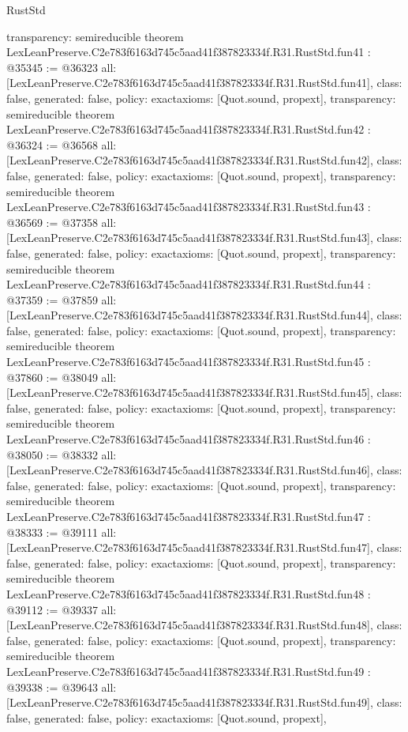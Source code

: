 \begin{lexlean}{RustStd}
\begin{coremodule}
{  transparency: semireducible
}
theorem LexLeanPreserve.C2e783f6163d745c5aad41f387823334f.R31.RustStd.fun41 : @35345 := @36323 {
  all: [LexLeanPreserve.C2e783f6163d745c5aad41f387823334f.R31.RustStd.fun41],
  class: false,
  generated: false,
  policy: exact{axioms: [Quot.sound, propext]},
  transparency: semireducible
}
theorem LexLeanPreserve.C2e783f6163d745c5aad41f387823334f.R31.RustStd.fun42 : @36324 := @36568 {
  all: [LexLeanPreserve.C2e783f6163d745c5aad41f387823334f.R31.RustStd.fun42],
  class: false,
  generated: false,
  policy: exact{axioms: [Quot.sound, propext]},
  transparency: semireducible
}
theorem LexLeanPreserve.C2e783f6163d745c5aad41f387823334f.R31.RustStd.fun43 : @36569 := @37358 {
  all: [LexLeanPreserve.C2e783f6163d745c5aad41f387823334f.R31.RustStd.fun43],
  class: false,
  generated: false,
  policy: exact{axioms: [Quot.sound, propext]},
  transparency: semireducible
}
theorem LexLeanPreserve.C2e783f6163d745c5aad41f387823334f.R31.RustStd.fun44 : @37359 := @37859 {
  all: [LexLeanPreserve.C2e783f6163d745c5aad41f387823334f.R31.RustStd.fun44],
  class: false,
  generated: false,
  policy: exact{axioms: [Quot.sound, propext]},
  transparency: semireducible
}
theorem LexLeanPreserve.C2e783f6163d745c5aad41f387823334f.R31.RustStd.fun45 : @37860 := @38049 {
  all: [LexLeanPreserve.C2e783f6163d745c5aad41f387823334f.R31.RustStd.fun45],
  class: false,
  generated: false,
  policy: exact{axioms: [Quot.sound, propext]},
  transparency: semireducible
}
theorem LexLeanPreserve.C2e783f6163d745c5aad41f387823334f.R31.RustStd.fun46 : @38050 := @38332 {
  all: [LexLeanPreserve.C2e783f6163d745c5aad41f387823334f.R31.RustStd.fun46],
  class: false,
  generated: false,
  policy: exact{axioms: [Quot.sound, propext]},
  transparency: semireducible
}
theorem LexLeanPreserve.C2e783f6163d745c5aad41f387823334f.R31.RustStd.fun47 : @38333 := @39111 {
  all: [LexLeanPreserve.C2e783f6163d745c5aad41f387823334f.R31.RustStd.fun47],
  class: false,
  generated: false,
  policy: exact{axioms: [Quot.sound, propext]},
  transparency: semireducible
}
theorem LexLeanPreserve.C2e783f6163d745c5aad41f387823334f.R31.RustStd.fun48 : @39112 := @39337 {
  all: [LexLeanPreserve.C2e783f6163d745c5aad41f387823334f.R31.RustStd.fun48],
  class: false,
  generated: false,
  policy: exact{axioms: [Quot.sound, propext]},
  transparency: semireducible
}
theorem LexLeanPreserve.C2e783f6163d745c5aad41f387823334f.R31.RustStd.fun49 : @39338 := @39643 {
  all: [LexLeanPreserve.C2e783f6163d745c5aad41f387823334f.R31.RustStd.fun49],
  class: false,
  generated: false,
  policy: exact{axioms: [Quot.sound, propext]},
}
\end{coremodule}
\end{lexlean}
